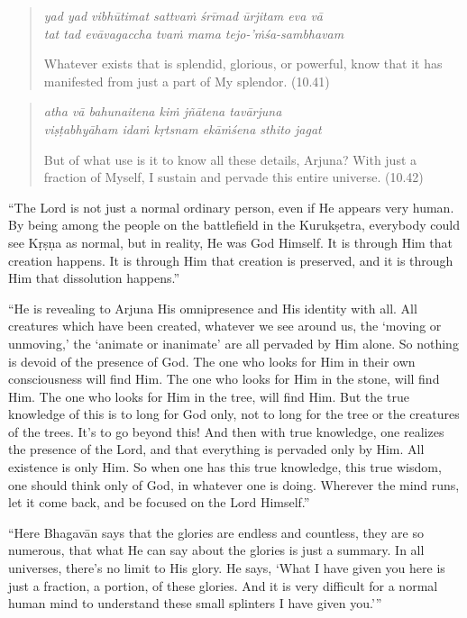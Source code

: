 \documentclass[12pt, twoside, openright]{memoir}
\begin{document}
\par
\begin{verse}
\textit{yad yad vibhūtimat sattvaṁ śrīmad ūrjitam eva vā} \\
\textit{tat tad evāvagaccha tvaṁ mama tejo-’ṁśa-sambhavam}

\noindent Whatever exists that is splendid, glorious, or powerful, know that it has manifested from just a part of My splendor. (10.41)
\end{verse}
\par



\par
\begin{verse}
\textit{atha vā bahunaitena kiṁ jñātena tavārjuna} \\
\textit{viṣṭabhyāham idaṁ kṛtsnam ekāṁśena sthito jagat}

\noindent But of what use is it to know all these details, Arjuna? With just a fraction of Myself, I sustain and pervade this entire universe. (10.42)
\end{verse}
\par


\enquote{The Lord is not just a normal ordinary person, even if He appears very human. By being among the people on the battlefield in the Kurukṣetra, everybody could see Kṛṣṇa as normal, but in reality, He was God Himself. It is through Him that creation happens. It is through Him that creation is preserved, and it is through Him that dissolution happens.}

\enquote{He is revealing to Arjuna His omnipresence and His identity with all. All creatures which have been created, whatever we see around us, the \enquote{moving or unmoving,} the \enquote{animate or inanimate} are all pervaded by Him alone. So nothing is devoid of the presence of God. The one who looks for Him in their own consciousness will find Him. The one who looks for Him in the stone, will find Him. The one who looks for Him in the tree, will find Him. But the true knowledge of this is to long for God only, not to long for the tree or the creatures of the trees. It’s to go beyond this! And then with true knowledge, one realizes the presence of the Lord, and that everything is pervaded only by Him. All existence is only Him. So when one has this true knowledge, this true wisdom, one should think only of God, in whatever one is doing. Wherever the mind runs, let it come back, and be focused on the Lord Himself.}

\enquote{Here Bhagavān says that the glories are endless and countless, they are so numerous, that what He can say about the glories is just a summary. In all universes, there’s no limit to His glory. He says, \enquote{What I have given you here is just a fraction, a portion, of these glories. And it is very difficult for a normal human mind to understand these small splinters I have given you.}}
\end{document}
